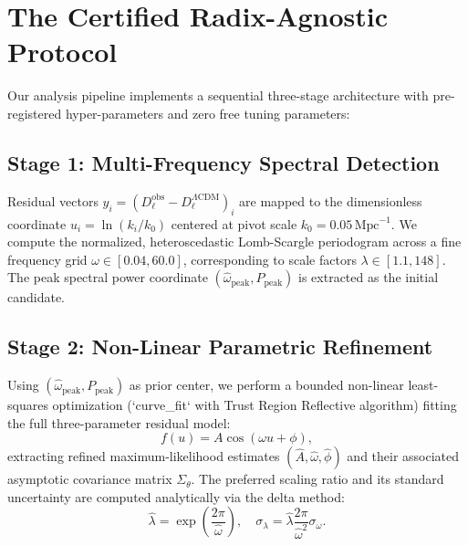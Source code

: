 \documentclass[10pt,twocolumn,a4paper]{article}
\begin{document}
\section{The Certified Radix-Agnostic Protocol}
Our analysis pipeline implements a sequential three-stage architecture with pre-registered hyper-parameters and zero free tuning parameters:

\subsection{Stage 1: Multi-Frequency Spectral Detection}
Residual vectors $y_i = (D_\ell^{\mathrm{obs}} - D_\ell^{\Lambda\mathrm{CDM}})_i$ are mapped to the dimensionless coordinate $u_i = \ln(k_i / k_0)$ centered at pivot scale $k_0 = 0.05\,\mathrm{Mpc}^{-1}$. We compute the normalized, heteroscedastic Lomb-Scargle periodogram across a fine frequency grid $\omega \in [0.04, 60.0]$, corresponding to scale factors $\lambda \in [1.1, 148]$. The peak spectral power coordinate $(\hat\omega_{\mathrm{peak}}, P_{\mathrm{peak}})$ is extracted as the initial candidate.

\subsection{Stage 2: Non-Linear Parametric Refinement}
Using $(\hat\omega_{\mathrm{peak}}, P_{\mathrm{peak}})$ as prior center, we perform a bounded non-linear least-squares optimization (`curve\_fit` with Trust Region Reflective algorithm) fitting the full three-parameter residual model:
\begin{equation}
f(u) = A \cos(\omega u + \phi),
\end{equation}
extracting refined maximum-likelihood estimates $(\hat A, \hat\omega, \hat\phi)$ and their associated asymptotic covariance matrix $\Sigma_{\theta}$. The preferred scaling ratio and its standard uncertainty are computed analytically via the delta method:
\begin{equation}
\hat\lambda = \exp\left( \frac{2\pi}{\hat\omega} \right), \quad \sigma_\lambda = \hat\lambda \frac{2\pi}{\hat\omega^2} \sigma_\omega.
\end{equation}
\end{document}
